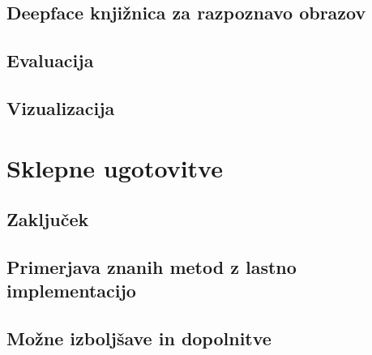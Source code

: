 \documentclass[a4paper,12pt,openright]{book}
\begin{document}
\section{Deepface knjižnica za razpoznavo obrazov}
\section{Evaluacija}
\section{Vizualizacija}



\chapter{Sklepne ugotovitve}
\section{Zaključek}
\section{Primerjava znanih metod z lastno implementacijo}
\section{Možne izboljšave in dopolnitve}






\printbibliography[heading=bibintoc,title={Literatura}]
\end{document}
